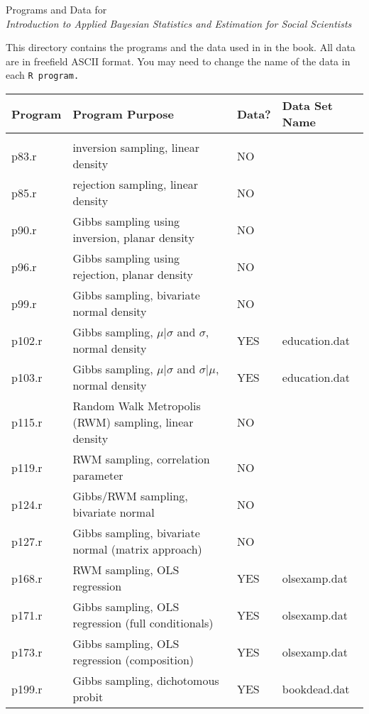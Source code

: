 \documentclass[12pt,titlepage]{article}
\begin{document}
\begin{center}
Programs and Data for \\
\it Introduction to Applied Bayesian Statistics and Estimation for Social Scientists\rm
\end{center}

\vspace{.3in}

This directory contains the programs and the data used in in the book.  All data are in freefield ASCII format.  You may need to change the name of the data in each \tt R \rm program.  

\vspace{.3in}
\footnotesize
\begin{center}
\begin{tabular}{llll}
Program   &Program Purpose &Data?  &Data Set Name \rm\\\hline \hline
\\
p83.r   &inversion sampling, linear density     &NO\\
p85.r   &rejection sampling, linear density     &NO\\
p90.r   &Gibbs sampling using inversion, planar density     &NO\\
p96.r   &Gibbs sampling using rejection, planar density     &NO\\
p99.r   &Gibbs sampling, bivariate normal density     &NO\\
p102.r  &Gibbs sampling, $\mu | \sigma$ and $\sigma$, normal density   &YES   &education.dat\\
p103.r  &Gibbs sampling, $\mu | \sigma$ and $\sigma | \mu$, normal density   &YES   &education.dat\\
p115.r  &Random Walk Metropolis (RWM) sampling, linear density     &NO\\
p119.r  &RWM sampling, correlation parameter     &NO\\
p124.r  &Gibbs/RWM sampling, bivariate normal    &NO\\
p127.r  &Gibbs sampling, bivariate normal (matrix approach)     &NO\\
p168.r  &RWM sampling, OLS regression     &YES   &olsexamp.dat \rm\\
p171.r  &Gibbs sampling, OLS regression (full conditionals)    &YES   &olsexamp.dat\\
p173.r  &Gibbs sampling, OLS regression (composition)     &YES   &olsexamp.dat\\
p199.r  &Gibbs sampling, dichotomous probit     &YES   &bookdead.dat\\

\end{tabular}
\end{center}
\end{document}
